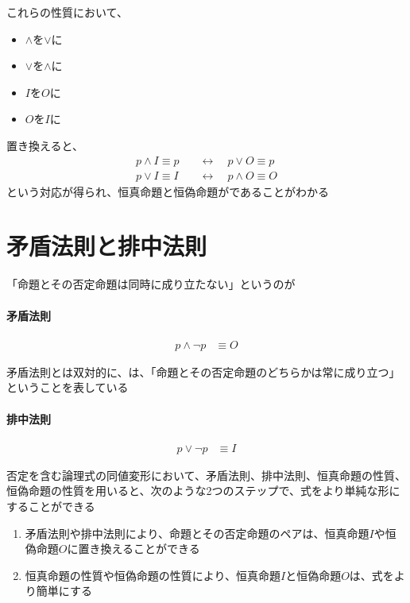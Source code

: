 \documentclass[../book_ronri-and-set]{subfiles}
\begin{document}
これらの性質において、
\begin{itemize}
  \item $\land$を$\lor$に
  \item $\lor$を$\land$に
  \item $I$を$O$に
  \item $O$を$I$に
\end{itemize}
置き換えると、
\begin{align*}
  p \land I \equiv p & \quad\leftrightarrow\quad p \lor O \equiv p  \\
  p \lor I \equiv I  & \quad\leftrightarrow\quad p \land O \equiv O
\end{align*}
という対応が得られ、恒真命題と恒偽命題がであることがわかる

\sectionline
\section{矛盾法則と排中法則}

「命題とその否定命題は同時に成り立たない」というのが

\begin{oframed}
  \paragraph{矛盾法則}
  \begin{align*}
    p \land \neg p & \equiv O
  \end{align*}
\end{oframed}

矛盾法則とは双対的に、は、「命題とその否定命題のどちらかは常に成り立つ」ということを表している

\begin{oframed}
  \paragraph{排中法則}
  \begin{align*}
    p \lor \neg p & \equiv I
  \end{align*}
\end{oframed}

\sectionline

否定を含む論理式の同値変形において、矛盾法則、排中法則、恒真命題の性質、恒偽命題の性質を用いると、次のような2つのステップで、式をより単純な形にすることができる

\begin{enumerate}
  \item 矛盾法則や排中法則により、命題とその否定命題のペアは、恒真命題$I$や恒偽命題$O$に置き換えることができる
  \item 恒真命題の性質や恒偽命題の性質により、恒真命題$I$と恒偽命題$O$は、式をより簡単にする
\end{enumerate}
\end{document}
